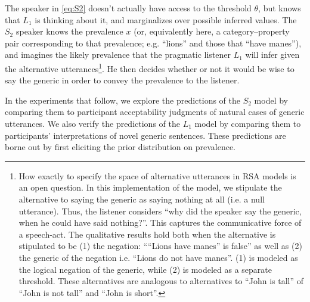 \documentclass[10pt,letterpaper]{article}
\begin{document}
The speaker in \eqref{eq:S2} doesn't actually have access to the threshold $\theta$, but knows that $L_{1}$ is thinking about it, and marginalizes over possible inferred values. 
The $S_{2}$ speaker knows the prevalence $x$ (or, equivalently here, a category--property pair corresponding to that prevalence; e.g. ``lions'' and those that ``have manes''), and imagines the likely prevalence that the pragmatic listener $L_{1}$ will infer given the alternative utterances\footnote{How exactly to specify the space of alternative utterances in RSA models is an open question. In this implementation of the model, we stipulate the alternative to saying the generic as saying nothing at all (i.e. a null utterance). Thus, the listener considers ``why did the speaker say the generic, when he could have said nothing?''. This captures the communicative force of a speech-act. The qualitative results hold both when the alternative is stipulated to be (1) the negation:  ````Lions have manes'' is false'' as well as (2) the generic of the negation i.e. ``Lions do not have manes''. (1) is modeled as the logical negation of the generic, while (2) is modeled as a separate threshold. These alternatives are  analogous to alternatives to ``John is tall'' of ``John is not tall'' and ``John is short''.}. 
He then decides whether or not it would be wise to say the generic in order to convey the prevalence to the listener.
 
In the experiments that follow, we explore the predictions of the $S_2$ model by comparing them to participant acceptability judgments of natural cases of generic utterances. 
We also verify the predictions of the $L_1$ model by comparing them to participants' interpretations of novel generic sentences.
These predictions are borne out by first eliciting the prior distribution on prevalence.
 
\end{document}
